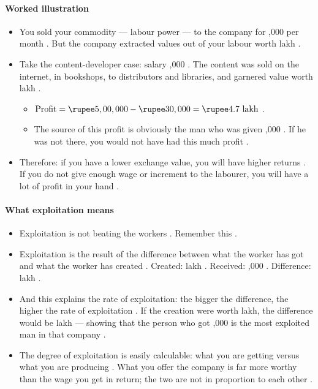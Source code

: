 \paragraph{Worked illustration}
\begin{itemize}
    \item You sold your commodity --- labour power --- to the company for ,000 per month . But the company extracted values out of your labour worth  lakh .
    \item Take the content-developer case: salary ,000 . The content was sold on the internet, in bookshops, to distributors and libraries, and garnered value worth  lakh .
    \begin{itemize}
        \item $\text{Profit} = \rupee5,00,000 - \rupee30,000 = \rupee4.7\text{ lakh}$ .
        \item The source of this profit is obviously the man who was given ,000 . If he was not there, you would not have had this much profit .
    \end{itemize}
    \item Therefore: if you have a lower exchange value, you will have higher returns . If you do not give enough wage or increment to the labourer, you will have a lot of profit in your hand .
\end{itemize}

\paragraph{What exploitation means}
\begin{itemize}
    \item Exploitation is not beating the workers . Remember this .
    \item Exploitation is the result of the difference between what the worker has got and what the worker has created . Created:  lakh . Received: ,000 . Difference:  lakh .
    \item And this explains the rate of exploitation: the bigger the difference, the higher the rate of exploitation . If the creation were worth  lakh, the difference would be  lakh --- showing that the person who got ,000 is the most exploited man in that company .
    \item The degree of exploitation is easily calculable: what you are getting versus what you are producing . What you offer the company is far more worthy than the wage you get in return; the two are not in proportion to each other .
\end{itemize}

